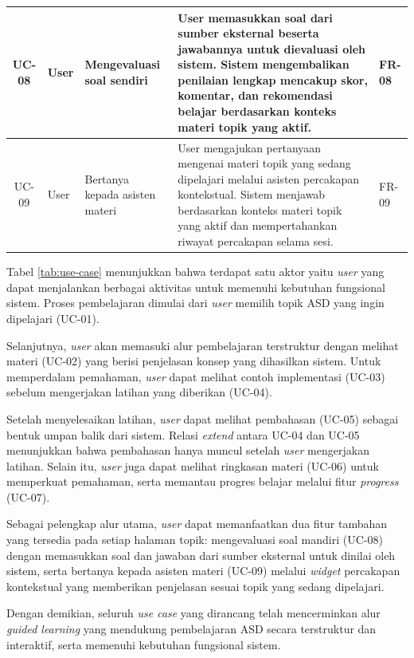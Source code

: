 \begin{longtable}{|c|L{1.3cm}|L{2.6cm}|L{3.9cm}|L{2.5cm}|}
UC-08 & User & Mengevaluasi soal sendiri &
User memasukkan soal dari sumber eksternal beserta jawabannya untuk dievaluasi oleh sistem. Sistem mengembalikan penilaian lengkap mencakup skor, komentar, dan rekomendasi belajar berdasarkan konteks materi topik yang aktif. &
FR-08 \\
\hline

UC-09 & User & Bertanya kepada asisten materi &
User mengajukan pertanyaan mengenai materi topik yang sedang dipelajari melalui asisten percakapan kontekstual. Sistem menjawab berdasarkan konteks materi topik yang aktif dan mempertahankan riwayat percakapan selama sesi. &
FR-09 \\
\hline

\end{longtable}

Tabel \ref{tab:use-case} menunjukkan bahwa terdapat satu aktor yaitu \textit{user} yang dapat menjalankan berbagai aktivitas untuk memenuhi kebutuhan fungsional sistem. Proses pembelajaran dimulai dari \textit{user} memilih topik ASD yang ingin dipelajari (UC-01).

Selanjutnya, \textit{user} akan memasuki alur pembelajaran terstruktur dengan melihat materi (UC-02) yang berisi penjelasan konsep yang dihasilkan sistem. Untuk memperdalam pemahaman, \textit{user} dapat melihat contoh implementasi (UC-03) sebelum mengerjakan latihan yang diberikan (UC-04).

Setelah menyelesaikan latihan, \textit{user} dapat melihat pembahasan (UC-05) sebagai bentuk umpan balik dari sistem. Relasi \textit{extend} antara UC-04 dan UC-05 menunjukkan bahwa pembahasan hanya muncul setelah \textit{user} mengerjakan latihan. Selain itu, \textit{user} juga dapat melihat ringkasan materi (UC-06) untuk memperkuat pemahaman, serta memantau progres belajar melalui fitur \textit{progress} (UC-07).

Sebagai pelengkap alur utama, \textit{user} dapat memanfaatkan dua fitur tambahan yang tersedia pada setiap halaman topik: mengevaluasi soal mandiri (UC-08) dengan memasukkan soal dan jawaban dari sumber eksternal untuk dinilai oleh sistem, serta bertanya kepada asisten materi (UC-09) melalui \textit{widget} percakapan kontekstual yang memberikan penjelasan sesuai topik yang sedang dipelajari.

Dengan demikian, seluruh \textit{use case} yang dirancang telah mencerminkan alur \textit{guided learning} yang mendukung pembelajaran ASD secara terstruktur dan interaktif, serta memenuhi kebutuhan fungsional sistem.


